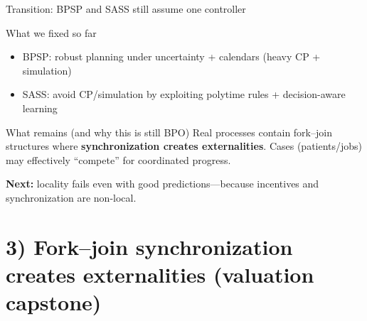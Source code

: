 \documentclass[aspectratio=169,10pt]{beamer}
\newcommand{\btext}[1]{\textbf{\color{darkred}#1}}
\begin{document}
\begin{frame}{Transition: BPSP and SASS still assume one controller}
  \begin{block}{What we fixed so far}
    \begin{itemize}
      \item BPSP: robust planning under uncertainty + calendars (heavy CP + simulation)
      \item SASS: avoid CP/simulation by exploiting polytime rules + decision-aware learning
    \end{itemize}
  \end{block}
  \vspace{0.1cm}
  \begin{block}{What remains (and why this is still BPO)}
    Real processes contain fork--join structures where \btext{synchronization creates externalities}.
    Cases (patients/jobs) may effectively ``compete'' for coordinated progress.
  \end{block}
  \vspace{0.1cm}
  \btext{Next:} locality fails even with good predictions—because incentives and synchronization are non-local.
\end{frame}

\section{3) Fork--join synchronization creates externalities (valuation capstone)}
\end{document}
